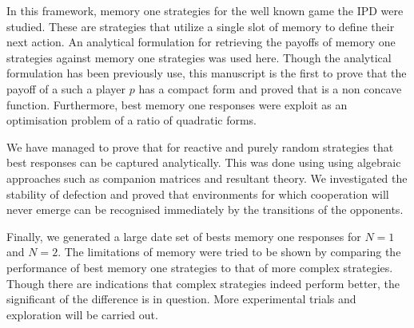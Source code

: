\documentclass[10pt]{article}
\begin{document}
In this framework, memory one strategies for the well known game the IPD were
studied. These are strategies that utilize a single slot of memory to define their
next action. An analytical formulation for retrieving the payoffs of memory one
strategies against memory one strategies was used here. Though the analytical
formulation has been previously use, this manuscript is the first to prove that the payoff
of a such a player \(p\) has a compact form and proved that is a non concave
function. Furthermore, best memory one responses were exploit as an optimisation
problem of a ratio of quadratic forms.

We have managed to prove that for reactive and purely random strategies
that best responses can be captured analytically. This was done using using algebraic
approaches such as companion matrices and resultant theory. We investigated the
stability of defection and proved that environments for which cooperation will
never emerge can be recognised immediately by the transitions of the opponents.

Finally,  we generated a large date set of bests memory one responses for \(N=1\) and
\(N=2\). The limitations of memory were tried to be shown by comparing the performance
of best memory one strategies to that of more complex strategies. Though there are
indications that complex strategies indeed perform better, the significant of the
difference is in question. More experimental trials and exploration will be
carried out.

\appendix





\end{document}
